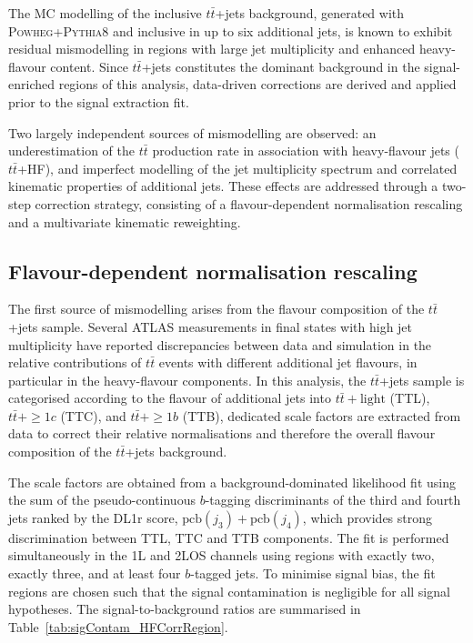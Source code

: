 ﻿The MC modelling of the inclusive $t\bar{t}$+jets background,
generated with \textsc{Powheg}+\textsc{Pythia8} and inclusive in up to six additional jets,
is known to exhibit residual mismodelling in regions with large jet multiplicity
and enhanced heavy-flavour content.
Since $t\bar{t}$+jets constitutes the dominant background in the signal-enriched regions of this analysis,
data-driven corrections are derived and applied prior to the signal extraction fit.

Two largely independent sources of mismodelling are observed:
an underestimation of the $t\bar{t}$ production rate in association
with heavy-flavour jets ($t\bar{t}$+HF),
and imperfect modelling of the jet multiplicity spectrum and
correlated kinematic properties of additional jets.
These effects are addressed through a two-step correction strategy,
consisting of a flavour-dependent normalisation rescaling
and a multivariate kinematic reweighting.

\subsection{Flavour-dependent normalisation rescaling}
\label{sec:hf_rew_thesis}

The first source of mismodelling arises from the flavour composition
of the $t\bar{t}$+jets sample.
Several ATLAS measurements in final states with high jet multiplicity
have reported discrepancies between data and simulation
in the relative contributions of $t\bar{t}$ events with different
additional jet flavours, in particular in the heavy-flavour components.
In this analysis, the $t\bar{t}$+jets sample is categorised according to the flavour of additional jets into
$t\bar{t}+\mathrm{light}$ (TTL),
$t\bar{t}+\ge1c$ (TTC), and
$t\bar{t}+\ge1b$ (TTB),
dedicated scale factors are extracted from data to correct
their relative normalisations and therefore the overall flavour composition
of the $t\bar{t}$+jets background.

The scale factors are obtained from a background-dominated likelihood fit using the sum of the pseudo-continuous $b$-tagging discriminants of the third and fourth jets ranked by the DL1r score,
$\mathrm{pcb}(j_3)+\mathrm{pcb}(j_4)$,
which provides strong discrimination between TTL, TTC and TTB components.
The fit is performed simultaneously in the 1L and 2LOS channels using regions with exactly two, exactly three, and at least four $b$-tagged jets.
To minimise signal bias, the fit regions are chosen such that the signal contamination is negligible for all signal hypotheses. 
The signal-to-background ratios are summarised in Table~\ref{tab:sigContam_HFCorrRegion}.

